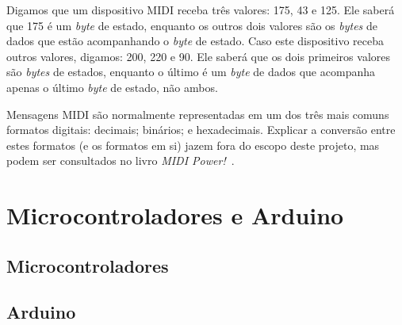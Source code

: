             Digamos que um dispositivo MIDI receba três valores: 175, 43 e 125. Ele saberá que 175 é um \textit{byte} de estado, enquanto os outros dois valores são os \textit{bytes} de dados que estão acompanhando o \textit{byte} de estado. Caso este dispositivo receba outros valores, digamos: 200, 220 e 90. Ele saberá que os dois primeiros valores são \textit{bytes} de estados, enquanto o último é um \textit{byte} de dados que acompanha apenas o último \textit{byte} de estado, não ambos.

            Mensagens MIDI são normalmente representadas em um dos três mais comuns formatos digitais: decimais; binários; e hexadecimais. Explicar a conversão entre estes formatos (e os formatos em si) jazem fora do escopo deste projeto, mas podem ser consultados no livro \textit{MIDI Power!}~\cite{Guerin}.

    \section{Microcontroladores e Arduino}

        

        \subsection{Microcontroladores}



        \subsection{Arduino}

